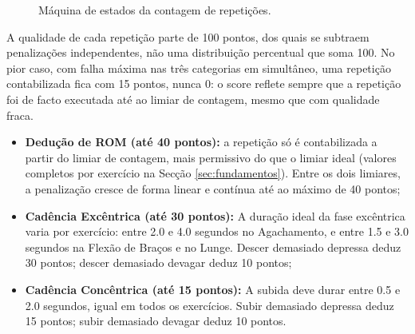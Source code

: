 \begin{figure}[h]
   \centering
   \caption{Máquina de estados da contagem de repetições.}
   \label{fig:stateMachine}
\end{figure}

A qualidade de cada repetição parte de 100 pontos, dos quais se subtraem penalizações independentes, não uma distribuição percentual que soma 100. No pior caso, com falha máxima nas três categorias em simultâneo, uma repetição contabilizada fica com 15 pontos, nunca 0: o score reflete sempre que a repetição foi de facto executada até ao limiar de contagem, mesmo que com qualidade fraca.

\begin{itemize}
    \item \textbf{Dedução de ROM (até 40 pontos):} a repetição só é contabilizada a partir do limiar de contagem, mais permissivo do que o limiar ideal (valores completos por exercício na Secção \ref{sec:fundamentos}). Entre os dois limiares, a penalização cresce de forma linear e contínua até ao máximo de 40 pontos;
    \item \textbf{Cadência Excêntrica (até 30 pontos):} A duração ideal da fase excêntrica varia por exercício: entre 2.0 e 4.0 segundos no Agachamento, e entre 1.5 e 3.0 segundos na Flexão de Braços e no Lunge. Descer demasiado depressa deduz 30 pontos; descer demasiado devagar deduz 10 pontos;
    \item \textbf{Cadência Concêntrica (até 15 pontos):} A subida deve durar entre 0.5 e 2.0 segundos, igual em todos os exercícios. Subir demasiado depressa deduz 15 pontos; subir demasiado devagar deduz 10 pontos.
\end{itemize}


